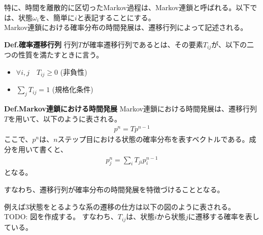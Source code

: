 \documentclass[a4paper,11pt]{jsarticle}
\numberwithin{equation}{section}
\begin{document}
特に、時間を離散的に区切ったMarkov過程は、Markov連鎖と呼ばれる。以下では、状態$\omega_{i}$を、簡単に$i$と表記することにする。\\
\indent
Markov連鎖における確率分布の時間発展は、遷移行列によって記述される。

\begin{itembox}[l]{\textbf{Def.確率遷移行列}}
    行列$T$が確率遷移行列であるとは、その要素$T_{ij}$が、以下の二つの性質を満たすときに言う。
    \begin{itemize}
        \item $\forall i,j \quad T_{ij} \geq 0$ (非負性)
        \item $\sum_{j} T_{ij} = 1$ (規格化条件)
    \end{itemize}
\end{itembox}

\begin{itembox}[l]{\textbf{Def.Markov連鎖における時間発展}}
    Markov連鎖における時間発展は、遷移行列$T$を用いて、以下のように表される。
        \begin{align}
            p^{n} = T p^{n-1}
        \end{align}
        ここで、$p^{n}$は、$n$ステップ目における状態の確率分布を表すベクトルである。成分を用いて書くと、
        \begin{align}
            p_{j}^{n} = \sum_{i} T_{ji} p_i^{n-1}
        \end{align}
        となる。
    \end{itembox}
すなわち、遷移行列が確率分布の時間発展を特徴づけることとなる。

例えば3状態をとるような系の遷移の仕方は以下の図のように表される。
TODO: 図を作成する。
すなわち、$T_{ij}$は、状態$i$から状態$j$に遷移する確率を表している。
\end{document}
